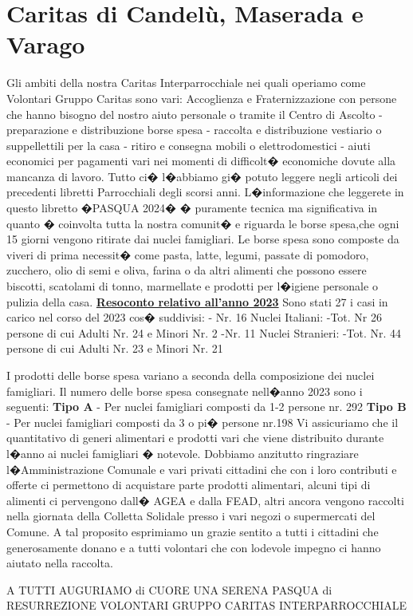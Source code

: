 \section{Caritas di Candelù, Maserada e Varago}
Gli ambiti della nostra Caritas Interparrocchiale nei quali operiamo come Volontari Gruppo Caritas sono vari: Accoglienza e Fraternizzazione con persone che hanno bisogno del nostro aiuto personale o tramite il Centro di Ascolto - preparazione e distribuzione borse spesa - raccolta e distribuzione vestiario o suppellettili per la casa - ritiro e consegna mobili o elettrodomestici - aiuti economici per pagamenti vari nei momenti di difficolt� economiche dovute alla mancanza di lavoro.                         
Tutto ci� l�abbiamo gi� potuto leggere negli articoli dei precedenti libretti Parrocchiali degli scorsi anni.
L�informazione che leggerete in questo libretto �PASQUA 2024� � puramente tecnica ma significativa in quanto � coinvolta  tutta la nostra comunit� e riguarda le borse spesa,che ogni 15 giorni vengono ritirate dai nuclei famigliari.
Le borse spesa sono composte da viveri di prima necessit� come pasta, latte, legumi, passate di pomodoro, zucchero, olio di semi e oliva, farina o da altri alimenti che possono essere biscotti, scatolami di tonno, marmellate e prodotti per l�igiene personale o pulizia della casa.
\textbf{\underline{Resoconto relativo all’anno  2023}}
Sono stati 27 i casi in carico nel corso del 2023 cos� suddivisi:
- Nr. 16 Nuclei Italiani:
-Tot. Nr  26 persone di cui Adulti Nr. 24  e Minori Nr. 2
-Nr. 11 Nuclei Stranieri:
-Tot. Nr. 44 persone di cui Adulti Nr. 23 e  Minori Nr. 21

I prodotti delle borse spesa variano a seconda della composizione dei nuclei famigliari.
Il numero delle borse spesa consegnate nell�anno 2023 sono i seguenti:
\textbf{Tipo A} - Per nuclei famigliari composti da 1-2 persone nr. 292
\textbf{Tipo B} - Per nuclei famigliari composti da 3 o pi� persone nr.198
Vi assicuriamo che il quantitativo di generi alimentari e prodotti vari che viene distribuito durante l�anno ai nuclei famigliari � notevole.
Dobbiamo anzitutto ringraziare l�Amministrazione Comunale e vari privati cittadini che con i loro contributi e offerte ci permettono di acquistare parte prodotti alimentari, alcuni tipi di alimenti ci pervengono dall� AGEA e dalla FEAD, altri ancora vengono raccolti nella giornata della Colletta Solidale presso i vari negozi o supermercati del Comune. A tal proposito esprimiamo un grazie sentito a tutti i cittadini che generosamente donano   e a tutti volontari che con lodevole impegno ci hanno aiutato nella raccolta.

A TUTTI AUGURIAMO di CUORE UNA SERENA PASQUA di RESURREZIONE
VOLONTARI GRUPPO CARITAS INTERPARROCCHIALE

